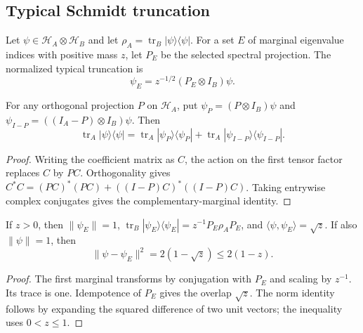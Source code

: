 \subsection{Typical Schmidt truncation}

\begin{definition}
\label{def:entropy_typical_pure_state}
\leanok
Let $\psi\in\mathcal H_A\otimes\mathcal H_B$ and let
$\rho_A=\operatorname{tr}_B|\psi\rangle\langle\psi|$.
For a set $E$ of marginal eigenvalue indices with positive mass $z$, let
$P_E$ be the selected spectral projection. The normalized typical truncation is
\[
 \psi_E=z^{-1/2}(P_E\otimes I_B)\psi.
\]
\end{definition}

\begin{lemma}
\label{lem:entropy_typical_projection_split}
\leanok
For any orthogonal projection $P$ on $\mathcal H_A$, put
$\psi_P=(P\otimes I_B)\psi$ and $\psi_{I-P}=((I_A-P)\otimes I_B)\psi$.
Then
\[
 \operatorname{tr}_A|\psi\rangle\langle\psi|
 =\operatorname{tr}_A|\psi_P\rangle\langle\psi_P|
  +\operatorname{tr}_A|\psi_{I-P}\rangle\langle\psi_{I-P}|.
\]
\end{lemma}
\begin{proof}
\leanok
Writing the coefficient matrix as $C$, the action on the first tensor factor
replaces $C$ by $PC$. Orthogonality gives
$C^*C=(PC)^*(PC)+((I-P)C)^*((I-P)C)$.
Taking entrywise complex conjugates gives the complementary-marginal identity.
\end{proof}

\begin{theorem}
\label{thm:entropy_typical_pure_state}
\leanok
{}
If $z>0$, then $\|\psi_E\|=1$,
$\operatorname{tr}_B|\psi_E\rangle\langle\psi_E|=z^{-1}P_E\rho_A P_E$, and
$\langle\psi,\psi_E\rangle=\sqrt z$.
If also $\|\psi\|=1$, then
\[
 \|\psi-\psi_E\|^2=2(1-\sqrt z)\le2(1-z).
\]
\end{theorem}
\begin{proof}
\leanok
The first marginal transforms by conjugation with $P_E$ and scaling by $z^{-1}$.
Its trace is one. Idempotence of $P_E$ gives the overlap $\sqrt z$.
The norm identity follows by expanding the squared difference of two unit vectors;
the inequality uses $0<z\le1$.
\end{proof}

